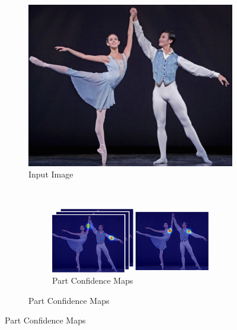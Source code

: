 \begin{figure}[h]
  \begin{subfigure}[t]{0.24\textwidth}
    \includegraphics[width=1\linewidth]{img/openpose_pipeline_a}
    \caption{Input Image}
    \label{fig:oppA}
  \end{subfigure}%
  ~
  \begin{subfigure}[b]{0.24\textwidth}
    \begin{subfigure}{1\textwidth}
      \includegraphics[width=1\linewidth]{img/openpose_pipeline_b}
      \caption{Part Confidence Maps}
      \label{fig:oppB}
    \end{subfigure}
    

\end{subfigure}
\end{figure}
